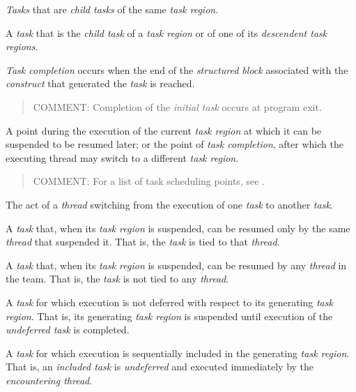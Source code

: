 \glossarydefstart
\emph{Tasks} that are \emph{child tasks} of the same \emph{task region}.
\glossarydefend

\glossarydefstart
A \emph{task} that is the \emph{child task} of a \emph{task region} or of one of its 
\emph{descendent task regions}.
\glossarydefend

\glossarydefstart
\emph{Task completion} occurs when the end of the \emph{structured block} associated with the 
\emph{construct} that generated the \emph{task} is reached.

\begin{quote}
COMMENT: Completion of the \emph{initial task} occurs at program exit.
\end{quote}
\glossarydefend

\glossarydefstart
A point during the execution of the current \emph{task region} at which it can be 
suspended to be resumed later; or the point of \emph{task completion}, after which the 
executing thread may switch to a different \emph{task region}. 

\begin{quote}
COMMENT: For a list of task scheduling points, see .
\end{quote}
\glossarydefend

\glossarydefstart
The act of a \emph{thread} switching from the execution of one \emph{task} to another \emph{task}.
\glossarydefend

\glossarydefstart
A \emph{task} that, when its \emph{task region} is suspended, can be resumed only by the same 
\emph{thread} that suspended it. That is, the \emph{task} is tied to that \emph{thread}. 
\glossarydefend

\glossarydefstart
A \emph{task} that, when its \emph{task region} is suspended, can be resumed by any \emph{thread} in 
the team. That is, the \emph{task} is not tied to any \emph{thread}. 
\glossarydefend

\glossarydefstart
A \emph{task} for which execution is not deferred with respect to its generating \emph{task} 
\emph{region}. That is, its generating \emph{task region} is suspended until execution of the 
\emph{undeferred task} is completed.
\glossarydefend

\glossarydefstart
A \emph{task} for which execution is sequentially included in the generating \emph{task region}. 
That is, an \emph{included task} is \emph{undeferred} and executed immediately by the 
\emph{encountering thread}.
\glossarydefend

